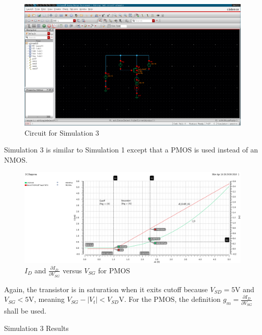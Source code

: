 \FloatBarrier

\begin{figure}[h!]
	\centering
	\includegraphics[scale=0.30]{./images/circuit3.PNG}
	\caption{Circuit for Simulation 3}
	\label{fig:circuit3}
\end{figure}

\FloatBarrier

Simulation 3 is similar to Simulation 1 except that a PMOS is used instead of an NMOS.

\FloatBarrier

\begin{figure}[h!]
	\centering
	\includegraphics[scale=0.45]{./images/500ua_point_pmos.PNG}
	\caption{$I_{D}$ and $\frac{\partial I_{D}}{\partial V_{SG}}$ versus $V_{SG}$ for PMOS}
	\label{fig:id_vs_vgs_pmos}
\end{figure}

\FloatBarrier

Again, the transistor is in saturation when it exits cutoff because $V_{SD} = 5$\si{\volt} and $V_{SG} < 5$\si{\volt}, meaning $V_{SG} - |V_{t}| < V_{SD}$\si{\volt}.
For the PMOS, the definition $g_{m} = \frac{\partial I_{D}}{\partial V_{SG}}$ shall be used.

\FloatBarrier

\begin{table}[h!]
	\centering
	\caption{Simulation 3 Results}
	\label{tab:sim3_results}
\end{table}

\FloatBarrier

